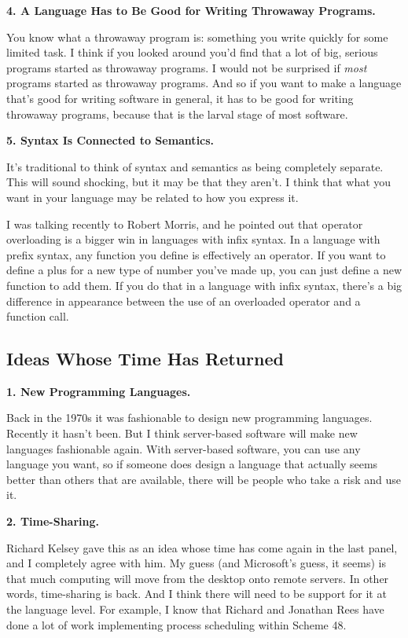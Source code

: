 \textbf{4. A Language Has to Be Good for Writing Throwaway Programs.}

You know what a throwaway program is: something you write quickly for
some limited task. I think if you looked around you'd find that a lot of
big, serious programs started as throwaway programs. I would not be
surprised if \emph{most} programs started as throwaway programs. And so
if you want to make a language that's good for writing software in
general, it has to be good for writing throwaway programs, because that
is the larval stage of most software.

\textbf{5. Syntax Is Connected to Semantics.}

It's traditional to think of syntax and semantics as being completely
separate. This will sound shocking, but it may be that they aren't. I
think that what you want in your language may be related to how you
express it.

I was talking recently to Robert Morris, and he pointed out that
operator overloading is a bigger win in languages with infix syntax. In
a language with prefix syntax, any function you define is effectively an
operator. If you want to define a plus for a new type of number you've
made up, you can just define a new function to add them. If you do that
in a language with infix syntax, there's a big difference in appearance
between the use of an overloaded operator and a function call.

\subsection{Ideas Whose Time Has
Returned}\label{ideas-whose-time-has-returned}

\textbf{1. New Programming Languages.}

Back in the 1970s it was fashionable to design new programming
languages. Recently it hasn't been. But I think server-based software
will make new languages fashionable again. With server-based software,
you can use any language you want, so if someone does design a language
that actually seems better than others that are available, there will be
people who take a risk and use it.

\textbf{2. Time-Sharing.}

Richard Kelsey gave this as an idea whose time has come again in the
last panel, and I completely agree with him. My guess (and Microsoft's
guess, it seems) is that much computing will move from the desktop onto
remote servers. In other words, time-sharing is back. And I think there
will need to be support for it at the language level. For example, I
know that Richard and Jonathan Rees have done a lot of work implementing
process scheduling within Scheme 48.

